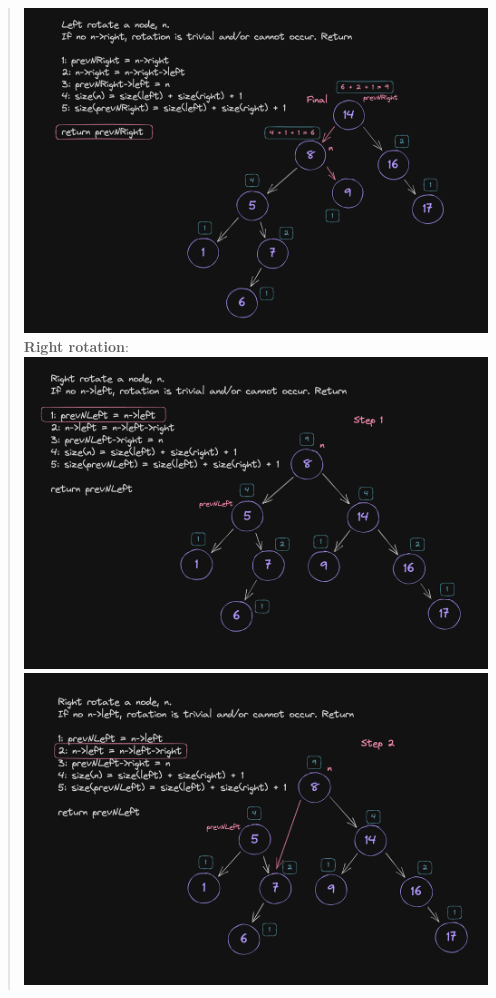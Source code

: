 \documentclass[11pt]{article}
\begin{document}
\begin{enumerate}
\begin{enumerate}
\begin{quote}
           \newline
           \includegraphics[scale=0.3]{left_rotations/lrf.png}         
           \newline
            \newline
            \textbf{Right rotation}: \newline \newline
           \includegraphics[scale=0.3]{right_rotations/rr1.png}         
           \newline
           \includegraphics[scale=0.3]{right_rotations/rr2.png}         

\end{quote}
\end{enumerate}
\end{enumerate}
\end{document}
